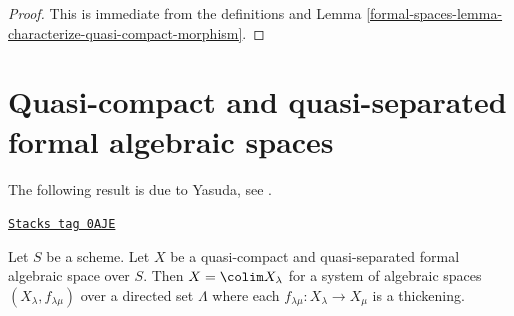 \begin{proof}
This is immediate from the definitions and
Lemma \ref{formal-spaces-lemma-characterize-quasi-compact-morphism}.
\end{proof}

\section{Quasi-compact and quasi-separated formal algebraic spaces}
\label{formal-spaces-section-quasi-compact-quasi-separated}
The following result is due to Yasuda, see
\cite[Proposition 3.32]{Yasuda}.

\begin{lemma}
\label{formal-spaces-lemma-structure-quasi-compact-quasi-separated}
\href{https://stacks.math.columbia.edu/tag/0AJE}{\texttt{Stacks tag 0AJE}}

\begin{reference}
\cite[Proposition 3.32]{Yasuda}
\end{reference}
Let $S$ be a scheme. Let $X$ be a quasi-compact and quasi-separated
formal algebraic space over $S$. Then $X = \colim X_\lambda$
for a system of algebraic spaces $(X_\lambda, f_{\lambda \mu})$
over a directed set $\Lambda$ where each
$f_{\lambda \mu} : X_\lambda \to X_\mu$ is a thickening.
\end{lemma}

